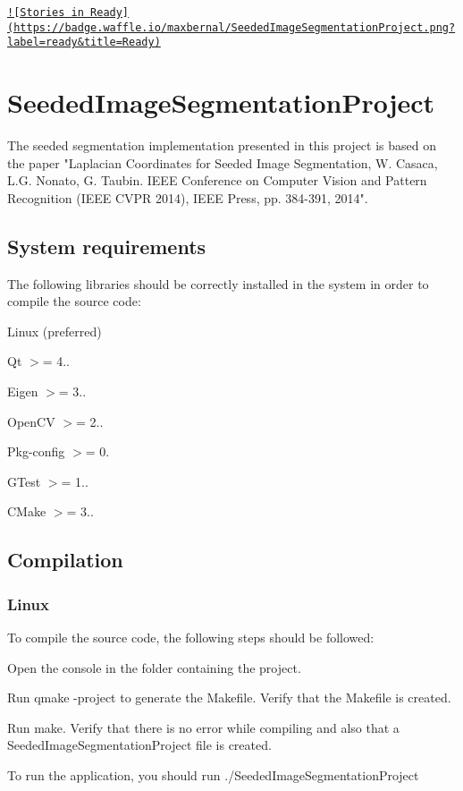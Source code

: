 \href{https://waffle.io/maxbernal/SeededImageSegmentationProject}{\tt !\mbox{[}Stories in Ready\mbox{]}(https\-://badge.\-waffle.\-io/maxbernal/\-Seeded\-Image\-Segmentation\-Project.\-png?label=ready\&title=\-Ready)}

\section*{Seeded\-Image\-Segmentation\-Project}

The seeded segmentation implementation presented in this project is based on the paper "Laplacian Coordinates for Seeded Image Segmentation, W. Casaca, L.\-G. Nonato, G. Taubin. I\-E\-E\-E Conference on Computer Vision and Pattern Recognition (I\-E\-E\-E C\-V\-P\-R 2014), I\-E\-E\-E Press, pp. 384-\/391, 2014".

\subsection*{System requirements}

The following libraries should be correctly installed in the system in order to compile the source code\-:
\begin{DoxyItemize}
\item Linux (preferred)
\item Qt $>$= 4..
\item Eigen $>$= 3..
\item Open\-C\-V $>$= 2..
\item Pkg-\/config $>$= 0.
\item G\-Test $>$= 1..
\item C\-Make $>$= 3..
\end{DoxyItemize}

\subsection*{Compilation}

\subsubsection*{Linux}

To compile the source code, the following steps should be followed\-:
\begin{DoxyItemize}
\item Open the console in the folder containing the project.
\item Run qmake -\/project to generate the Makefile. Verify that the Makefile is created.
\item Run make. Verify that there is no error while compiling and also that a Seeded\-Image\-Segmentation\-Project file is created.
\item To run the application, you should run ./\-Seeded\-Image\-Segmentation\-Project 
\end{DoxyItemize}